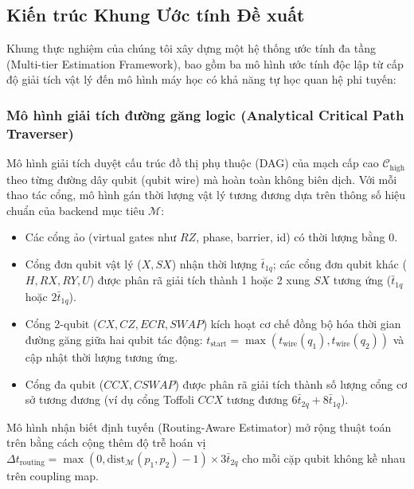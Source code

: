 \documentclass[11pt, a4paper]{article}
\begin{document}
\subsection{Kiến trúc Khung Ước tính Đề xuất}
Khung thực nghiệm của chúng tôi xây dựng một hệ thống ước tính đa tầng (Multi-tier Estimation Framework), bao gồm ba mô hình ước tính độc lập từ cấp độ giải tích vật lý đến mô hình máy học có khả năng tự học quan hệ phi tuyến:

\subsubsection{Mô hình giải tích đường găng logic (Analytical Critical Path Traverser)}
Mô hình giải tích duyệt cấu trúc đồ thị phụ thuộc (DAG) của mạch cấp cao $\mathcal{C}_{\text{high}}$ theo từng đường dây qubit (qubit wire) mà hoàn toàn không biên dịch. Với mỗi thao tác cổng, mô hình gán thời lượng vật lý tương đương dựa trên thông số hiệu chuẩn của backend mục tiêu $\mathcal{M}$:
\begin{itemize}
    \item Các cổng ảo (virtual gates như $RZ$, phase, barrier, id) có thời lượng bằng $0$.
    \item Cổng đơn qubit vật lý ($X, SX$) nhận thời lượng $\bar{t}_{1q}$; các cổng đơn qubit khác ($H, RX, RY, U$) được phân rã giải tích thành 1 hoặc 2 xung $SX$ tương ứng ($\bar{t}_{1q}$ hoặc $2 \bar{t}_{1q}$).
    \item Cổng 2-qubit ($CX, CZ, ECR, SWAP$) kích hoạt cơ chế đồng bộ hóa thời gian đường găng giữa hai qubit tác động: $t_{\text{start}} = \max(t_{\text{wire}}(q_1), t_{\text{wire}}(q_2))$ và cập nhật thời lượng tương ứng.
    \item Cổng đa qubit ($CCX, CSWAP$) được phân rã giải tích thành số lượng cổng cơ sở tương đương (ví dụ cổng Toffoli $CCX$ tương đương $6 \bar{t}_{2q} + 8 \bar{t}_{1q}$).
\end{itemize}
Mô hình nhận biết định tuyến (Routing-Aware Estimator) mở rộng thuật toán trên bằng cách cộng thêm độ trễ hoán vị $\Delta t_{\text{routing}} = \max(0, \text{dist}_{\mathcal{M}}(p_1, p_2) - 1) \times 3 \bar{t}_{2q}$ cho mỗi cặp qubit không kề nhau trên coupling map.
\end{document}
